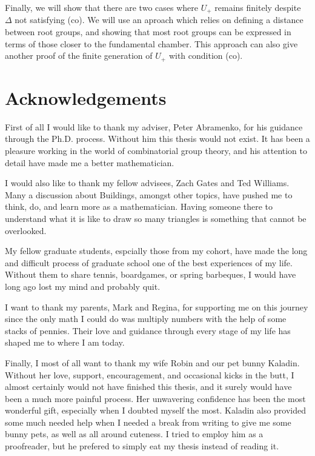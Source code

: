 \documentclass[12 pt,oneside]{book}
\begin{document}
Finally, we will show that there are two cases where $U_+$ remains finitely despite $\Delta$ not satisfying (co). We will use an aproach which relies on defining a distance between root groups, and showing that most root groups can be expressed in terms of those closer to the fundamental chamber. This approach can also give another proof of the finite generation of $U_+$ with condition (co).
\clearpage
\chapter*{Acknowledgements}
First of all I would like to thank my adviser, Peter Abramenko, for his guidance through the Ph.D. process. Without him this thesis would not exist. It has been a pleasure working in the world of combinatorial group theory, and his attention to detail have made me a better mathematician.

I would also like to thank my fellow advisees, Zach Gates and Ted Williams. Many a discussion about Buildings, amongst other topics, have pushed me to think, do, and learn more as a mathematician. Having someone there to understand what it is like to draw so many triangles is something that cannot be overlooked.

My fellow graduate students, espcially those from my cohort, have made the long and difficult process of graduate school one of the best experiences of my life. Without them to share tennis, boardgames, or spring barbeques, I would have long ago lost my mind and probably quit.

I want to thank my parents, Mark and Regina, for supporting me on this journey since the only math I could do was multiply numbers with the help of some stacks of pennies. Their love and guidance through every stage of my life has shaped me to where I am today.

Finally, I most of all want to thank my wife Robin and our pet bunny Kaladin. Without her love, support, encouragement, and occasional kicks in the butt, I almost certainly would not have finished this thesis, and it surely would have been a much more painful process. Her unwavering confidence has been the most wonderful gift, especially when I doubted myself the most. Kaladin also provided some much needed help when I needed a break from writing to give me some bunny pets, as well as all around cuteness. I tried to employ him as a proofreader, but he prefered to simply eat my thesis instead of reading it.




\tableofcontents
\mainmatter
\end{document}
